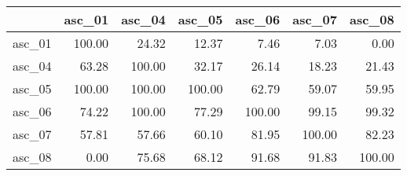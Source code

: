 \begin{tabular}{lrrrrrr}
\toprule
{} &  asc\_01 &  asc\_04 &  asc\_05 &  asc\_06 &  asc\_07 &  asc\_08 \\
\midrule
asc\_01 &  100.00 &   24.32 &   12.37 &    7.46 &    7.03 &    0.00 \\
asc\_04 &   63.28 &  100.00 &   32.17 &   26.14 &   18.23 &   21.43 \\
asc\_05 &  100.00 &  100.00 &  100.00 &   62.79 &   59.07 &   59.95 \\
asc\_06 &   74.22 &  100.00 &   77.29 &  100.00 &   99.15 &   99.32 \\
asc\_07 &   57.81 &   57.66 &   60.10 &   81.95 &  100.00 &   82.23 \\
asc\_08 &    0.00 &   75.68 &   68.12 &   91.68 &   91.83 &  100.00 \\
\bottomrule
\end{tabular}
